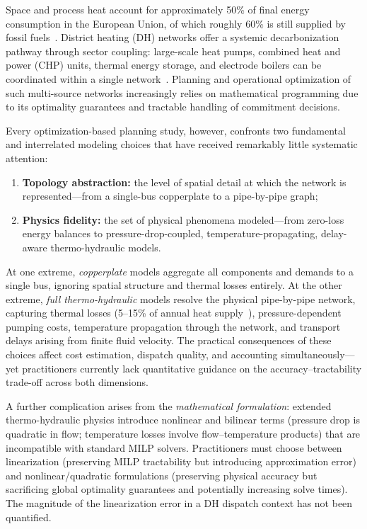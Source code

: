 \documentclass[review,3p]{elsarticle}
\begin{document}
Space and process heat account for approximately 50\% of final energy
consumption in the European Union, of which roughly 60\% is still
supplied by fossil fuels~\cite{EUheating2016}. District heating (DH)
networks offer a systemic decarbonization pathway through sector
coupling: large-scale heat pumps, combined heat and power (CHP) units,
thermal energy storage, and electrode boilers can be coordinated within
a single network~\cite{Lund2014_4GDH,Werner2017}. Planning and
operational optimization of such multi-source networks increasingly
relies on mathematical programming due to its optimality guarantees
and tractable handling of commitment decisions.

Every optimization-based planning study, however, confronts two
fundamental and interrelated modeling choices that have received
remarkably little systematic attention:
\begin{enumerate}[nosep]
    \item \textbf{Topology abstraction:} the level of spatial detail
    at which the network is represented---from a single-bus
    copperplate to a pipe-by-pipe graph;
    \item \textbf{Physics fidelity:} the set of physical phenomena
    modeled---from zero-loss energy balances to pressure-drop-coupled,
    temperature-propagating, delay-aware thermo-hydraulic models.
\end{enumerate}

At one extreme, \emph{copperplate} models aggregate all components
and demands to a single bus, ignoring spatial structure and thermal
losses entirely. At the other extreme, \emph{full thermo-hydraulic}
models resolve the physical pipe-by-pipe network, capturing thermal
losses (5--15\% of annual heat supply~\cite{Frederiksen2013,Talebi2016}),
pressure-dependent pumping costs, temperature propagation through the
network, and transport delays arising from finite fluid velocity. The
practical consequences of these choices affect cost estimation,
dispatch quality, and  accounting simultaneously---yet
practitioners currently lack quantitative guidance on the
accuracy--tractability trade-off across both dimensions.

A further complication arises from the \emph{mathematical formulation}:
extended thermo-hydraulic physics introduce nonlinear and bilinear
terms (pressure drop is quadratic in flow; temperature losses
involve flow--temperature products) that are incompatible with
standard MILP solvers. Practitioners must choose between
linearization (preserving MILP tractability but introducing
approximation error) and nonlinear/quadratic formulations (preserving
physical accuracy but sacrificing global optimality guarantees and
potentially increasing solve times). The magnitude of the
linearization error in a DH dispatch context has not been quantified.
\end{document}
